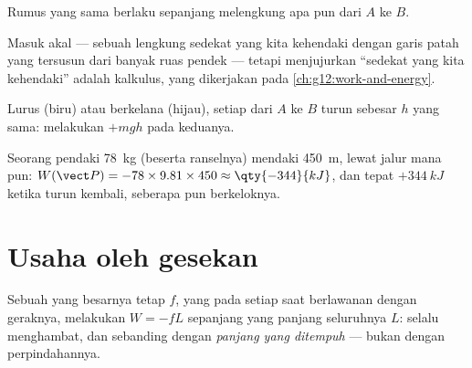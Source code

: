 \begin{proposition}\label{prop:g11:work-of-force:anypath}
Rumus yang sama berlaku sepanjang  melengkung apa pun dari $A$
ke $B$.
\end{proposition}
\admitted

\begin{remark}\label{rem:g11:work-of-force:anypath}
Masuk akal --- sebuah lengkung sedekat yang kita kehendaki dengan garis
patah yang tersusun dari banyak ruas pendek --- tetapi menjujurkan
``sedekat yang kita kehendaki'' adalah kalkulus, yang dikerjakan pada
\cref{ch:g12:work-and-energy}.
\end{remark}

\begin{omfigure}

{\small Lurus (biru) atau berkelana (hijau), setiap  dari $A$
ke $B$ turun sebesar $h$ yang sama:  melakukan $+mgh$ pada
keduanya.}
\end{omfigure}

\begin{example}[Pendaki]\label{ex:g11:work-of-force:hiker}
Seorang pendaki \qty{78}{kg} (beserta ranselnya) mendaki \qty{450}{m},
lewat jalur mana pun:
$W(\vect P) = -78 \times 9.81 \times 450 \approx \qty{-344}{kJ}$, dan
tepat $+\qty{344}{kJ}$ ketika turun kembali, seberapa pun berkeloknya.
\end{example}

\section{Usaha oleh gesekan}

\begin{proposition}\label{prop:g11:work-of-force:friction}
Sebuah  yang besarnya tetap $f$, yang pada setiap saat
berlawanan dengan geraknya, melakukan  $W = -fL$ sepanjang
 yang panjang seluruhnya $L$: selalu menghambat, dan sebanding
dengan \emph{panjang  yang ditempuh} --- bukan dengan
perpindahannya.
\end{proposition}

